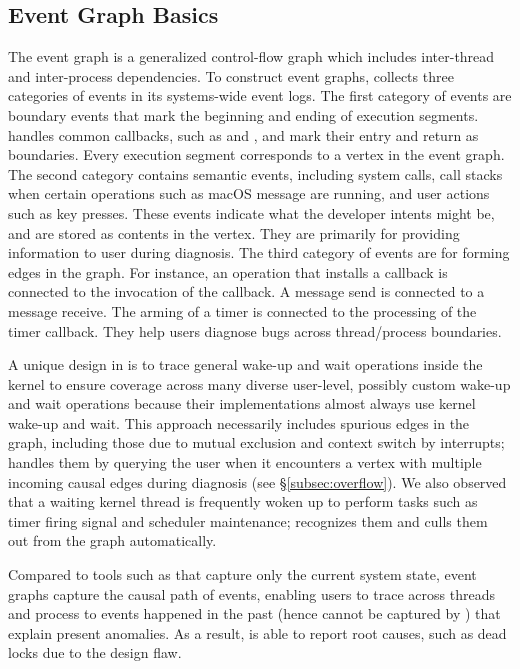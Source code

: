 \subsection{Event Graph Basics}\label{subsec:eventgraph}

The event graph is a generalized control-flow graph which includes inter-thread
and inter-process dependencies. To construct event graphs, \xxx collects three
categories of events in its systems-wide event logs. The first category of
events are boundary events that mark the beginning and ending of execution
segments.  \xxx handles common callbacks, such as
 and , and mark their entry
and return as boundaries.  Every execution segment corresponds to a vertex in
the event graph.  The second category contains semantic events, including
system calls, call stacks when certain operations such as macOS message are
running, and user actions such as key presses. These events indicate what the
developer intents might be, and are stored as contents in the vertex. They are
primarily for providing information to user during diagnosis. The third
category of events are for forming edges in the graph. For instance, an
operation that installs a callback is connected to the invocation of the
callback. A message send is connected to a message receive. The arming of a
timer is connected to the processing of the timer callback. They help users
diagnose bugs across thread/process boundaries.

A unique design in \xxx is to trace general wake-up and wait operations inside
the kernel to ensure coverage across many diverse user-level, possibly custom
wake-up and wait operations because their implementations almost always use
kernel wake-up and wait. This approach necessarily includes spurious edges
in the graph, including those due to mutual exclusion and context switch by
interrupts; \xxx handles them by querying the user when it encounters a vertex
with multiple incoming causal edges during diagnosis (see \S\ref{subsec:overflow}).
We also observed that a waiting kernel thread is frequently woken up to perform
tasks such as timer firing signal and scheduler maintenance; \xxx recognizes
them and culls them out from the graph automatically.

Compared to tools such as \spindump that capture only the current system state,
event graphs capture the causal path of events, enabling users to trace across
threads and process to events happened in the past (hence cannot be captured by
\spindump) that explain present anomalies. As a result, \xxx is able to report
root causes, such as dead locks due to the design flaw.

